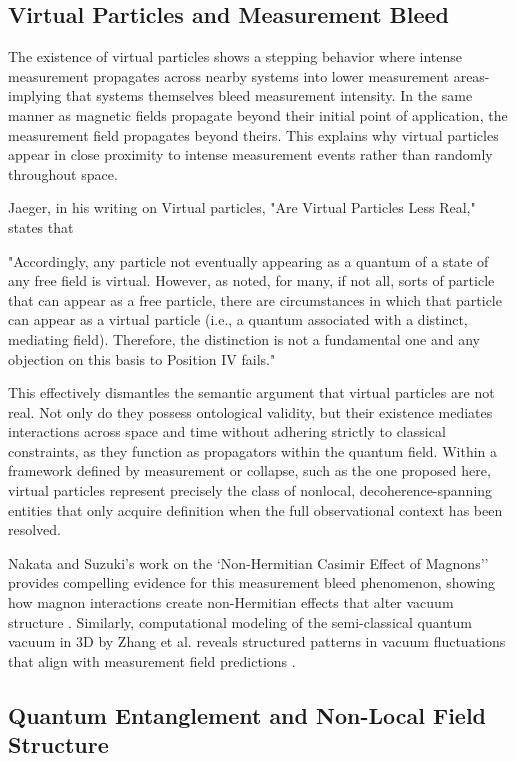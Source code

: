 \subsection{Virtual Particles and Measurement Bleed}

The existence of virtual particles shows a stepping behavior where intense measurement propagates across nearby systems into lower measurement areas-implying that systems themselves bleed measurement intensity. In the same manner as magnetic fields propagate beyond their initial point of application, the measurement field propagates beyond theirs. This explains why virtual particles appear in close proximity to intense measurement events rather than randomly throughout space.

Jaeger, in his writing on Virtual particles, "Are Virtual Particles Less Real," states that 

"Accordingly, any particle not eventually appearing as a quantum of a state of any free field is virtual. However, as noted, for many, if not all, sorts of particle that can appear as a free particle, there are circumstances in which that particle can appear as a virtual particle (i.e., a quantum associated with a distinct, mediating field). Therefore, the distinction is not a fundamental one and any objection on this basis to Position IV fails."\cite{jaeger_are_2019}

This effectively dismantles the semantic argument that virtual particles are not real. Not only do they possess ontological validity, but their existence mediates interactions across space and time without adhering strictly to classical constraints, as they function as propagators within the quantum field. Within a framework defined by measurement or collapse, such as the one proposed here, virtual particles represent precisely the class of nonlocal, decoherence-spanning entities that only acquire definition when the full observational context has been resolved.

Nakata and Suzuki's work on the `Non-Hermitian Casimir Effect of Magnons'' provides compelling evidence for this measurement bleed phenomenon, showing how magnon interactions create non-Hermitian effects that alter vacuum structure \cite{nakata_non-hermitian_2024}. Similarly, computational modeling of the semi-classical quantum vacuum in 3D by Zhang et al. reveals structured patterns in vacuum fluctuations that align with measurement field predictions \cite{ZhangVacuum2025}.

\subsection{Quantum Entanglement and Non-Local Field Structure}


